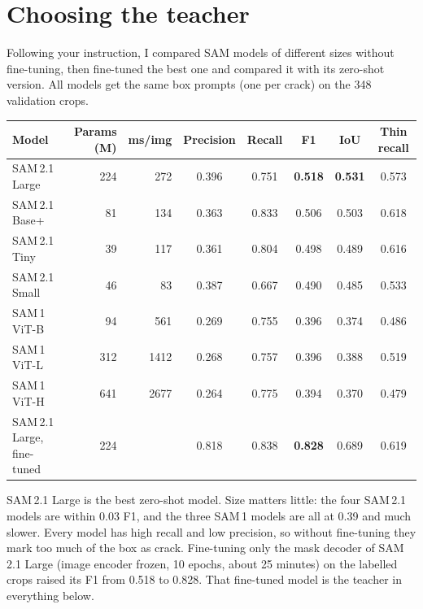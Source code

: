 \documentclass[11pt,a4paper]{article}
\begin{document}
\section{Choosing the teacher}
Following your instruction, I compared SAM models of different sizes without fine-tuning, then fine-tuned the best one and compared
it with its zero-shot version. All models get the same box prompts (one per crack) on the 348 validation crops.
\begin{center}\small
\begin{tabular}{lrrccccc}
\toprule
Model & Params (M) & ms/img & Precision & Recall & F1 & IoU & Thin recall\\
\midrule
SAM\,2.1 Large & 224 & 272 & 0.396 & 0.751 & \textbf{0.518} & \textbf{0.531} & 0.573\\
SAM\,2.1 Base+ & 81 & 134 & 0.363 & 0.833 & 0.506 & 0.503 & 0.618\\
SAM\,2.1 Tiny & 39 & 117 & 0.361 & 0.804 & 0.498 & 0.489 & 0.616\\
SAM\,2.1 Small & 46 & 83 & 0.387 & 0.667 & 0.490 & 0.485 & 0.533\\
SAM\,1 ViT-B & 94 & 561 & 0.269 & 0.755 & 0.396 & 0.374 & 0.486\\
SAM\,1 ViT-L & 312 & 1412 & 0.268 & 0.757 & 0.396 & 0.388 & 0.519\\
SAM\,1 ViT-H & 641 & 2677 & 0.264 & 0.775 & 0.394 & 0.370 & 0.479\\
\midrule
SAM\,2.1 Large, fine-tuned & 224 & & 0.818 & 0.838 & \textbf{0.828} & 0.689 & 0.619\\
\bottomrule
\end{tabular}\end{center}
SAM\,2.1 Large is the best zero-shot model. Size matters little: the four SAM\,2.1 models are within 0.03 F1, and the three SAM\,1 models
are all at 0.39 and much slower. Every model has high recall and low precision, so without fine-tuning they mark too much of the box as crack.
Fine-tuning only the mask decoder of SAM\,2.1 Large (image encoder frozen, 10 epochs, about 25 minutes) on the labelled crops raised
its F1 from 0.518 to 0.828. That fine-tuned model is the teacher in everything below.
\end{document}
